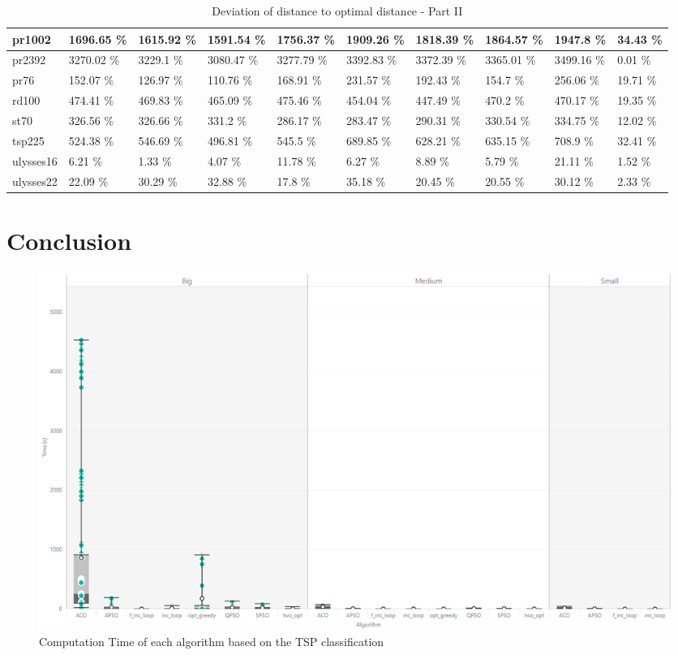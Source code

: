 \documentclass[conference]{IEEEtran}
\begin{document}
\begin{table}[h]
\begin{adjustbox}{width=\columnwidth}
\begin{tabular}{ | l | l | l | l | l | l | l | l | l | l | }
pr1002 & 1696.65 \% & 1615.92 \% & 1591.54 \% & 1756.37 \% & 1909.26 \% & 1818.39 \% & 1864.57 \% & 1947.8 \% & 34.43 \% \\ \hline
pr2392 & 3270.02 \% & 3229.1 \% & 3080.47 \% & 3277.79 \% & 3392.83 \% & 3372.39 \% & 3365.01 \% & 3499.16 \% & 0.01 \% \\ \hline
pr76 & 152.07 \% & 126.97 \% & 110.76 \% & 168.91 \% & 231.57 \% & 192.43 \% & 154.7 \% & 256.06 \% & 19.71 \% \\ \hline
rd100 & 474.41 \% & 469.83 \% & 465.09 \% & 475.46 \% & 454.04 \% & 447.49 \% & 470.2 \% & 470.17 \% & 19.35 \% \\ \hline
st70 & 326.56 \% & 326.66 \% & 331.2 \% & 286.17 \% & 283.47 \% & 290.31 \% & 330.54 \% & 334.75 \% & 12.02 \% \\ \hline
tsp225 & 524.38 \% & 546.69 \% & 496.81 \% & 545.5 \% & 689.85 \% & 628.21 \% & 635.15 \% & 708.9 \% & 32.41 \% \\ \hline
ulysses16 & 6.21 \% & 1.33 \% & 4.07 \% & 11.78 \% & 6.27 \% & 8.89 \% & 5.79 \% & 21.11 \% & 1.52 \% \\ \hline
ulysses22 & 22.09 \% & 30.29 \% & 32.88 \% & 17.8 \% & 35.18 \% & 20.45 \% & 20.55 \% & 30.12 \% & 2.33 \% \\ \hline

	    \end{tabular}
	    \end{adjustbox}
	    \caption{Deviation of distance to optimal distance - Part II}
	    \label{tab:deviationp2}
	\end{table}


    \section{Conclusion}


	
	


\clearpage
\appendix

    \begin{figure}[h]
    		\centering
    		\includegraphics[width=\textwidth]{boxplot_time_nodesize.png}
    		\caption{Computation Time of each algorithm based on the TSP classification}
    		\label{fig:boxPlotTime}
    \end{figure}
	    
\end{document}

